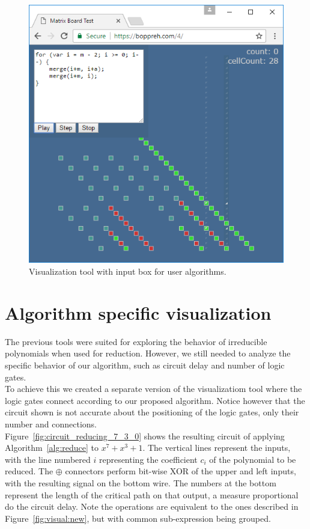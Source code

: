 \begin{figure}
  \caption{Visualization tool with input box for user algorithms.}
  \label{fig:source}
  \centering
  \includegraphics[width = .7\columnwidth]{figures/source.png}
\end{figure}


\section{Algorithm specific visualization}

The previous tools were suited for exploring the behavior of irreducible polynomials when used for reduction. However, we still needed to analyze the specific behavior of our algorithm, such as circuit delay and number of logic gates. \\

To achieve this we created a separate version of the visualizatiom tool where the logic gates connect according to our proposed algorithm. Notice however that the circuit shown is not accurate about the positioning of the logic gates, only their number and connections. \\

Figure~\ref{fig:circuit_reducing_7_3_0} shows the resulting circuit of applying Algorithm~\ref{alg:reduce} to $x^7 + x^3 + 1$. The vertical lines represent the inputs, with the line numbered $i$ representing the coefficient $c_i$ of the polynomial to be reduced. The $\oplus$  connectors perform bit-wise XOR of the upper and left inputs, with the resulting signal on the bottom wire. The numbers at the bottom represent the length of the critical path on that output, a measure proportional do the circuit delay. Note the operations are equivalent to the ones described in Figure~\ref{fig:visual:new}, but with common sub-expression being grouped. \\

